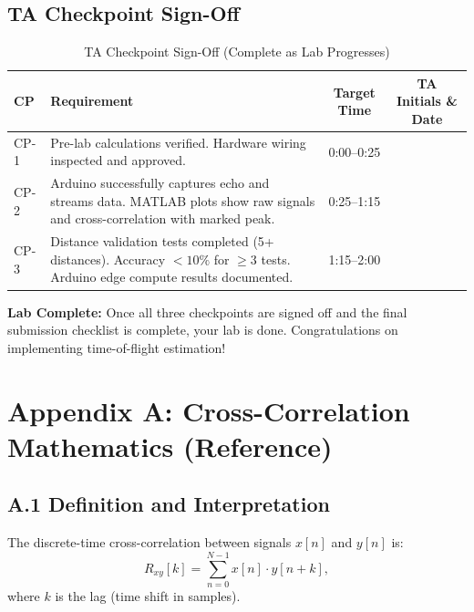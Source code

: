 \documentclass[11pt,letterpaper]{article}
\begin{document}
\subsection{TA Checkpoint Sign-Off}

\begin{table}[H]
    \centering
    \caption{TA Checkpoint Sign-Off (Complete as Lab Progresses)}
    \label{tab:checkpoints}
    \begin{tabularx}{\linewidth}{l X c c}
    \toprule
    \textbf{CP} & \textbf{Requirement} & \textbf{Target Time} & \textbf{TA Initials \& Date}\\
    \midrule
    CP-1 & Pre-lab calculations verified. Hardware wiring inspected and approved. & 0:00--0:25 & \underline{\hspace{2.5cm}} \\[0.1in]
    CP-2 & Arduino successfully captures echo and streams data. MATLAB plots show raw signals and cross-correlation with marked peak. & 0:25--1:15 & \underline{\hspace{2.5cm}} \\[0.1in]
    CP-3 & Distance validation tests completed (5+ distances). Accuracy $< 10\%$ for $\ge 3$ tests. Arduino edge compute results documented. & 1:15--2:00 & \underline{\hspace{2.5cm}} \\[0.1in]
    \bottomrule
    \end{tabularx}
\end{table}

\noindent
\textbf{Lab Complete:} Once all three checkpoints are signed off and the final submission checklist is complete, your lab is done. Congratulations on implementing time-of-flight estimation!

\clearpage

\section*{Appendix A: Cross-Correlation Mathematics (Reference)}

\subsection*{A.1 Definition and Interpretation}

The discrete-time cross-correlation between signals $x[n]$ and $y[n]$ is:
\begin{equation}
R_{xy}[k] = \sum_{n=0}^{N-1} x[n] \cdot y[n+k],
\end{equation}
where $k$ is the lag (time shift in samples).
\end{document}
